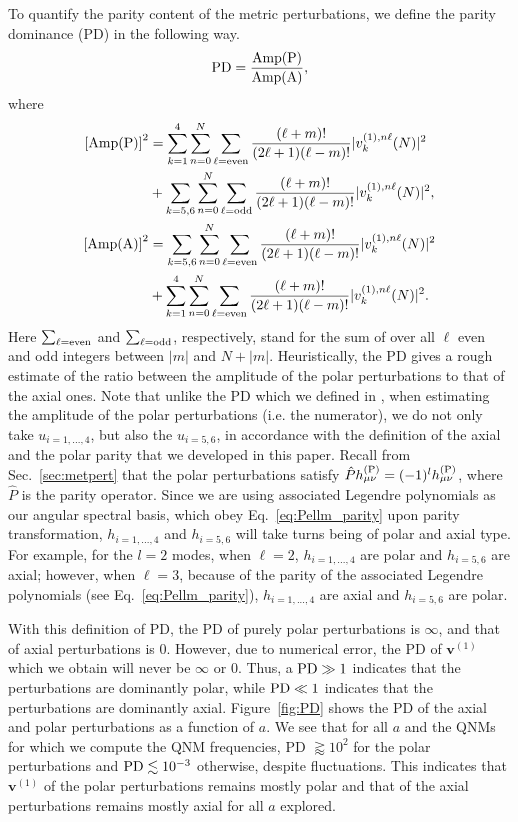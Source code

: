 \documentclass[aps,prx,amsmath,floats,floatfix,twocolumn,
  superscriptaddress,nofootinbib,showpacs]{revtex4-1}
\begin{document}
To quantify the parity content of the metric perturbations, we define the parity dominance (PD) in the following way. 
\begin{equation}\label{eq:PD_01}
\text{PD} = \frac{\rm Amp(P)}{\rm Amp(A)}, 
\end{equation}
where 
\begin{align}\label{eq:PD_02}
\left[\text{Amp(P)}\right]^2 &= \displaystyle \sum_{k=1}^{4} \sum_{n=0}^{N} \sum_{\ell = \rm even} \frac{(\ell+m)!}{(2\ell+1)(\ell-m)!} |v_k^{(1), n \ell}(N)|^2 
\nonumber \\
&+ \sum_{k=5,6} \sum_{n=0}^{N} \sum_{\ell = \rm odd} \frac{(\ell+m)!}{(2\ell+1)(\ell-m)!} |v_k^{(1), n \ell}(N)|^2, \\
\left[\text{Amp(A)}\right]^2 & = \displaystyle \sum_{k=5, 6} \sum_{n=0}^{N} \sum_{\ell = \rm even} \frac{(\ell+m)!}{(2\ell+1)(\ell-m)!} |v_k^{(1), n \ell}(N)|^2
\nonumber \\
&+\sum_{k=1}^{4} \sum_{n=0}^{N} \sum_{\ell = \rm even} \frac{(\ell+m)!}{(2\ell+1)(\ell-m)!} |v_k^{(1), n \ell}(N)|^2. 
\end{align}
Here $\sum_{\ell = \rm even}$ and $\sum_{\ell = \rm odd}$, respectively, stand for the sum of over all $\ell$ even and odd integers between $|m|$ and $N+|m|$. 
Heuristically, the PD gives a rough estimate of the ratio between the amplitude of the polar perturbations to that of the axial ones. 
Note that unlike the PD which we defined in \cite{Chung:2023wkd}, when estimating the amplitude of the polar perturbations (i.e. the numerator), we do not only take $u_{i=1,...,4}$, but also the $u_{i=5,6}$, in accordance with the definition of the axial and the polar parity that we developed in this paper. 
Recall from Sec.~\ref{sec:metpert} that the polar perturbations satisfy $ \hat{P} h^{\rm (P)}_{\mu \nu} = (-1)^{l} h^{\rm (P)}_{\mu \nu} $, where $\hat{P}$ is the parity operator. 
Since we are using associated Legendre polynomials as our angular spectral basis, which obey Eq.~\eqref{eq:Pellm_parity} upon parity transformation, $h_{i=1, ..., 4}$ and $h_{i=5, 6}$ will take turns being of polar and axial type.  
For example, for the $l = 2$ modes, when $\ell = 2$, $h_{i=1, ..., 4}$ are polar and $h_{i=5, 6}$ are axial; however, when $\ell = 3$, because of the parity of the associated Legendre polynomials (see Eq.~\eqref{eq:Pellm_parity}), $h_{i=1, ..., 4}$ are axial and $h_{i=5, 6}$ are polar. 

With this definition of PD, the PD of purely polar perturbations is $\infty$, and that of axial perturbations is $0$. 
However, due to numerical error, the PD of $\textbf{v}^{(1)}$ which we obtain will never be $\infty$ or 0. 
Thus, a $\rm PD \gg 1 $ indicates that the perturbations are dominantly polar, while $\rm PD \ll 1$ indicates that the perturbations are dominantly axial. 
Figure~\ref{fig:PD} shows the PD of the axial and polar perturbations as a function of $a$. 
We see that for all $a$ and the QNMs for which we compute the QNM frequencies, PD $\gtrapprox 10^2 $ for the polar perturbations and $\rm PD \lesssim 10^{-3} $ otherwise, despite fluctuations. 
This indicates that $\textbf{v}^{(1)}$ of the polar perturbations remains mostly polar and that of the axial perturbations remains mostly axial for all $a$ explored.
\end{document}
